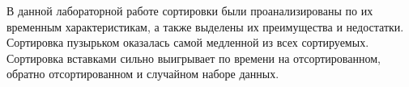 \Conclusion %

В данной лабораторной работе сортировки были проанализированы по их временным характеристикам, а также выделены их преимущества и недостатки. Сортировка пузырьком оказалась самой медленной из всех сортируемых. Сортировка вставками сильно выигрывает по времени на отсортированном, обратно отсортированном и случайном наборе данных. 


